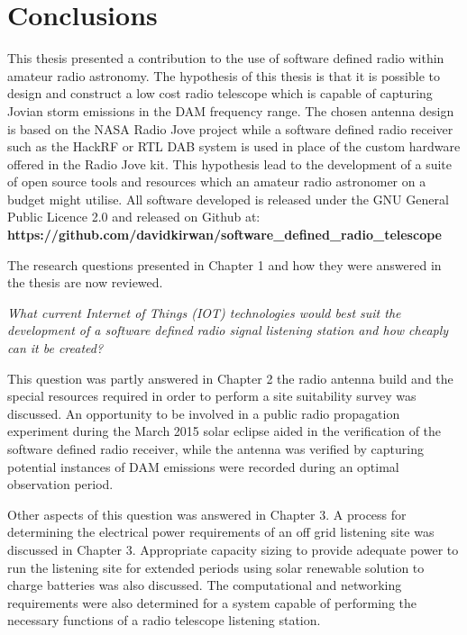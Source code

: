 \newpage
\chapter*{Conclusions}



This thesis presented a contribution to the use of software defined radio within amateur radio astronomy. The hypothesis of this thesis is that it is possible to design and construct a low cost radio telescope which is capable of capturing Jovian storm emissions in the \gls{DAM} frequency range. The chosen antenna design is based on the NASA Radio Jove project while a software defined radio receiver such as the HackRF or RTL DAB system is used in place of the custom hardware offered in the Radio Jove kit. This hypothesis lead to the development of a suite of open source tools and resources which an amateur radio astronomer on a budget might utilise. All software developed is released under the GNU General Public Licence 2.0 and released on Github at: \textbf{https://github.com/davidkirwan/software\_defined\_radio\_telescope}

The research questions presented in Chapter 1 and how they were answered in the thesis are now reviewed.

\textit{What current Internet of Things (\gls{IOT}) technologies would best suit the development of a software defined radio signal listening station and how cheaply can it be created?}

This question was partly answered in Chapter 2 the radio antenna build and the special resources required in order to perform a site suitability survey was discussed. An opportunity to be involved in a public radio propagation experiment during the March 2015 solar eclipse aided in the verification of the software defined radio receiver, while the antenna was verified by capturing potential instances of \gls{DAM} emissions were recorded during an optimal observation period.

Other aspects of this question was answered in Chapter 3. A process for determining the electrical power requirements of an off grid listening site was discussed in Chapter 3. Appropriate capacity sizing to provide adequate power to run the listening site for extended periods using solar renewable solution to charge batteries was also discussed. The computational and networking requirements were also determined for a system capable of performing the necessary functions of a radio telescope listening station. 

